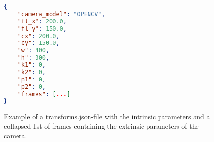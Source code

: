 \begin{figure}[ht]
\centering
\begin{lstlisting}[language=json,linewidth=0.9\linewidth]
{
    "camera_model": "OPENCV",
    "fl_x": 200.0,
    "fl_y": 150.0,
    "cx": 200.0,
    "cy": 150.0,
    "w": 400,
    "h": 300,
    "k1": 0,
    "k2": 0,
    "p1": 0,
    "p2": 0,
    "frames": [...]
}
\end{lstlisting}
\caption{Example of a transforms.json-file with the intrinsic parameters and a collapsed list of frames containing the extrinsic parameters of the camera.}
\label{code:transform-examples}
\end{figure}